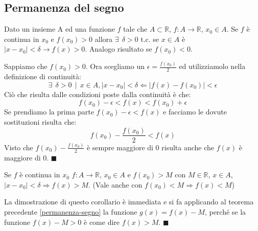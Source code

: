 \subsection{Permanenza del segno}
\begin{theorem}\label{permanenza-segno}
    Dato un insieme A ed una funzione $f$ tale che $A \subset \mathbb{R}$, $f: A \longrightarrow \mathbb{R}$, $x_0 \in A$. Se $f$ è continua in $x_0$ e $f(x_0) > 0$ allora $\exists \: \: \delta > 0$ t.c. se $x \in A$ è $|x - x_0| < \delta \longrightarrow f(x) > 0$. Analogo risultato se $f(x_0) < 0$.
    \begin{demostration}
    Sappiamo che $f(x_0) > 0$. Ora scegliamo un $\epsilon = \frac{f(x_0)}{2}$ ed utilizziamolo nella definizione di continuità:
    \begin{equation}
        \exists \: \: \delta > 0 \: \: | \: \: x \in A, |x - x_0| < \delta \Longleftarrow |f(x) - f(x_0)| < \epsilon
    \end{equation}
    Ciò che risulta dalle condizioni poste dalla continuità è che:
    \begin{equation}
        f(x_0) - \epsilon < f(x) < f(x_0) + \epsilon
    \end{equation}
    Se prendiamo la prima parte $f(x_0) - \epsilon < f(x)$ e facciamo le dovute sostituzioni risulta che:
    \begin{equation}
        f(x_0) - \frac{f(x_0)}{2} < f(x)
    \end{equation}
    Visto che $f(x_0) - \frac{f(x_0)}{2}$ è sempre maggiore di 0 risulta anche che $f(x)$ è maggiore di 0. $\blacksquare$
    \end{demostration}
    \begin{corollaries}\label{collorartio-permanenza-segno}
        Se $f$ è continua in $x_0$ $f: A \longrightarrow \mathbb{R}$, $x_0 \in A$ e $f(x_0) > M$ con $M \in \mathbb{R}$, $x \in A$, $|x - x_0| < \delta \Longrightarrow f(x) > M$. (Vale anche con $f(x_0) < M \Longrightarrow f(x) < M$)
    \end{corollaries}
    \begin{demostration}
        La dimostrazione di questo corollario è immediata e si fa applicando al teorema precedente \ref{permanenza-segno} la funzione $g(x) = f(x) - M$, perché se la funzione $f(x) - M > 0$ è come dire $f(x) > M$. $\blacksquare$
    \end{demostration}
\end{theorem}

